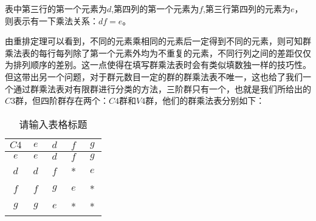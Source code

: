 表中第三行的第一个元素为$d$,第四列的第一个元素为$f$,第三行第四列的元素为$e$，则表示有一下乘法关系：$df=e$。

由重排定理可以看到，不同的元素乘相同的元素后一定得到不同的元素，则可知群乘法表的每行每列除了第一个元素外均为不重复的元素，不同行列之间的差距仅仅为排列顺序的差别。这一点使得在填写群乘法表时会有类似填数独一样的技巧性。但这带出另一个问题，对于群元数目一定的群的群乘法表不唯一，这也给了我们一个通过群乘法表对有限群进行分类的方法，三阶群只有一个，也就是我们所给出的$C3$群，但四阶群存在两个：$C4$群和$V4$群，他们的群乘法表分别如下：

\begin{table}[ht]
\centering
\caption{请输入表格标题}\label{groupt_tab2}
\begin{tabular}{|c|c|c|c|c|}
\hline
$C4$ & $~e~$ & $~d~$ & $~f~$ & $~g~$ \\
\hline
$e$ & $e$ & $d$ & $f$ & $g$ \\
\hline
$d$ & $d$ & $f$ & * & $e$ \\
\hline
$f$ & $f$ & $g$ & $e$ & * \\
\hline
$g$ & $g$ & $e$ & * & * \\
\hline
\end{tabular}
\end{table}

